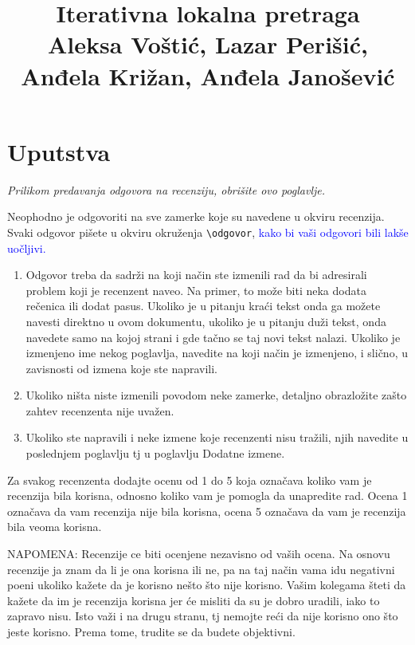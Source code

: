 \documentclass[a4paper]{report}
\newcommand{\odgovor}[1]{\textcolor{blue}{#1}}
\begin{document}
\title{Iterativna lokalna pretraga\\ \small{Aleksa Voštić, Lazar Perišić, Anđela Križan, Anđela Janošević}}

\maketitle

\tableofcontents

\chapter{Uputstva}
\emph{Prilikom predavanja odgovora na recenziju, obrišite ovo poglavlje.}

Neophodno je odgovoriti na sve zamerke koje su navedene u okviru recenzija. Svaki odgovor pišete u okviru okruženja \verb"\odgovor", \odgovor{kako bi vaši odgovori bili lakše uočljivi.} 
\begin{enumerate}

\item Odgovor treba da sadrži na koji način ste izmenili rad da bi adresirali problem koji je recenzent naveo. Na primer, to može biti neka dodata rečenica ili dodat pasus. Ukoliko je u pitanju kraći tekst onda ga možete navesti direktno u ovom dokumentu, ukoliko je u pitanju duži tekst, onda navedete samo na kojoj strani i gde tačno se taj novi tekst nalazi. Ukoliko je izmenjeno ime nekog poglavlja, navedite na koji način je izmenjeno, i slično, u zavisnosti od izmena koje ste napravili. 

\item Ukoliko ništa niste izmenili povodom neke zamerke, detaljno obrazložite zašto zahtev recenzenta nije uvažen.

\item Ukoliko ste napravili i neke izmene koje recenzenti nisu tražili, njih navedite u poslednjem poglavlju tj u poglavlju Dodatne izmene.
\end{enumerate}

Za svakog recenzenta dodajte ocenu od 1 do 5 koja označava koliko vam je recenzija bila korisna, odnosno koliko vam je pomogla da unapredite rad. Ocena 1 označava da vam recenzija nije bila korisna, ocena 5 označava da vam je recenzija bila veoma korisna. 

NAPOMENA: Recenzije ce biti ocenjene nezavisno od vaših ocena. Na osnovu recenzije ja znam da li je ona korisna ili ne, pa na taj način vama idu negativni poeni ukoliko kažete da je korisno nešto što nije korisno. Vašim kolegama šteti da kažete da im je recenzija korisna jer će misliti da su je dobro uradili, iako to zapravo nisu. Isto važi i na drugu stranu, tj nemojte reći da nije korisno ono što jeste korisno. Prema tome, trudite se da budete objektivni. 
\end{document}
